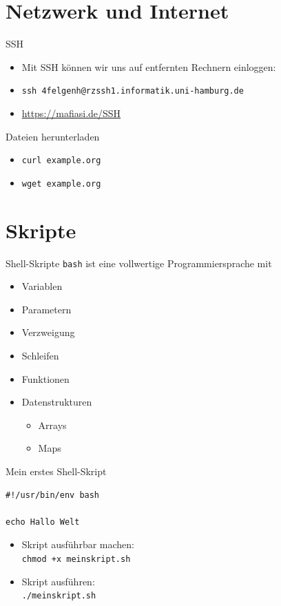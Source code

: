 \documentclass[compress]{beamer}
\begin{document}
\section{Netzwerk und Internet}

\begin{frame}[fragile]{SSH}
\begin{itemize}
\item Mit SSH können wir uns auf entfernten Rechnern einloggen:
\item \verb+ssh 4felgenh@rzssh1.informatik.uni-hamburg.de+
\item \url{https://mafiasi.de/SSH}
    \end{itemize}
\end{frame}

\begin{frame}[fragile]{Dateien herunterladen}
\begin{itemize}
\item \verb+curl example.org+
\item \verb+wget example.org+
\end{itemize}
\end{frame}

\section{Skripte}

\begin{frame}[fragile]{Shell-Skripte}
\verb+bash+ ist eine vollwertige Programmiersprache mit
\begin{itemize}
\item Variablen
\item Parametern
\item Verzweigung
\item Schleifen
\item Funktionen
\item Datenstrukturen
\begin{itemize}
\item Arrays
\item Maps
\end{itemize}
\end{itemize}
\end{frame}

\begin{frame}[fragile]{Mein erstes Shell-Skript}
\begin{verbatim}
#!/usr/bin/env bash

echo Hallo Welt
\end{verbatim}

\begin{itemize}
\item Skript ausführbar machen:\\
\verb|chmod +x meinskript.sh|
\item Skript ausführen:\\
\verb+./meinskript.sh+
\end{itemize}
\end{frame}
\end{document}
